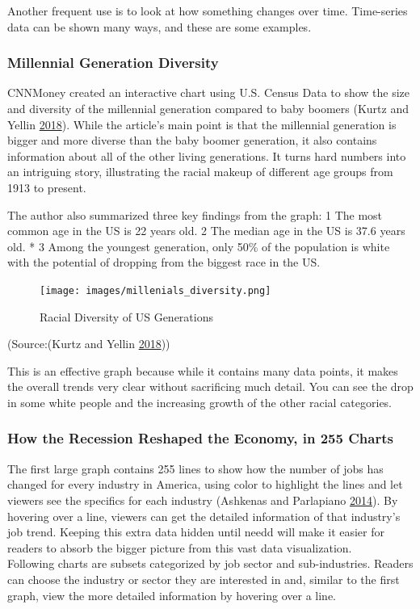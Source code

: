 \documentclass[]{book}
\begin{document}
Another frequent use is to look at how something changes over time. Time-series data can be shown many ways, and these are some examples.

\hypertarget{millennial-generation-diversity}{%
\subsubsection{Millennial Generation Diversity}\label{millennial-generation-diversity}}

CNNMoney created an interactive chart using U.S. Census Data to show the size and diversity of the millennial generation compared to baby boomers (Kurtz and Yellin \protect\hyperlink{ref-age_groups}{2018}). While the article's main point is that the millennial generation is bigger and more diverse than the baby boomer generation, it also contains information about all of the other living generations. It turns hard numbers into an intriguing story, illustrating the racial makeup of different age groups from 1913 to present.

The author also summarized three key findings from the graph:
1\textbar{} The most common age in the US is 22 years old.
2\textbar{} The median age in the US is 37.6 years old. *
3\textbar{} Among the youngest generation, only 50\% of the population is white with the potential of dropping from the biggest race in the US.

\begin{figure}
\centering
\texttt{[image: images/millenials\_diversity.png]}
\caption{Racial Diversity of US Generations}
\end{figure}

(Source:(Kurtz and Yellin \protect\hyperlink{ref-age_groups}{2018}))

This is an effective graph because while it contains many data points, it makes the overall trends very clear without sacrificing much detail. You can see the drop in some white people and the increasing growth of the other racial categories.

\hypertarget{how-the-recession-reshaped-the-economy-in-255-charts}{%
\subsubsection{How the Recession Reshaped the Economy, in 255 Charts}\label{how-the-recession-reshaped-the-economy-in-255-charts}}

The first large graph contains 255 lines to show how the number of jobs has changed for every industry in America, using color to highlight the lines and let viewers see the specifics for each industry (Ashkenas and Parlapiano \protect\hyperlink{ref-recession_economy}{2014}). By hovering over a line, viewers can get the detailed information of that industry's job trend. Keeping this extra data hidden until needd will make it easier for readers to absorb the bigger picture from this vast data visualization.\\
Following charts are subsets categorized by job sector and sub-industries. Readers can choose the industry or sector they are interested in and, similar to the first graph, view the more detailed information by hovering over a line.
\end{document}
